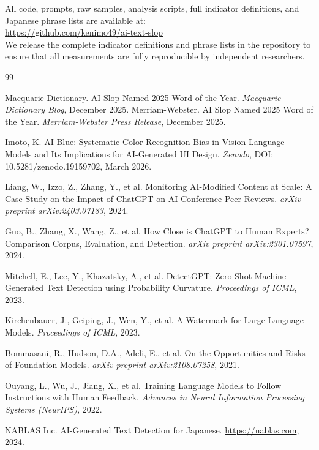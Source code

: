 \documentclass[11pt,a4paper]{article}
\begin{document}
All code, prompts, raw samples, analysis scripts, full indicator definitions, and Japanese phrase lists are available at:\\
\url{https://github.com/kenimo49/ai-text-slop}\\
We release the complete indicator definitions and phrase lists in the repository to ensure that all measurements are fully reproducible by independent researchers.

\begin{thebibliography}{99}

Macquarie Dictionary.
AI Slop Named 2025 Word of the Year.
\textit{Macquarie Dictionary Blog}, December 2025.
Merriam-Webster.
AI Slop Named 2025 Word of the Year.
\textit{Merriam-Webster Press Release}, December 2025.

Imoto, K.
AI Blue: Systematic Color Recognition Bias in Vision-Language Models and Its Implications for AI-Generated UI Design.
\textit{Zenodo}, DOI: 10.5281/zenodo.19159702, March 2026.

Liang, W., Izzo, Z., Zhang, Y., et al.
Monitoring AI-Modified Content at Scale: A Case Study on the Impact of ChatGPT on AI Conference Peer Reviews.
\textit{arXiv preprint arXiv:2403.07183}, 2024.

Guo, B., Zhang, X., Wang, Z., et al.
How Close is ChatGPT to Human Experts? Comparison Corpus, Evaluation, and Detection.
\textit{arXiv preprint arXiv:2301.07597}, 2024.

Mitchell, E., Lee, Y., Khazatsky, A., et al.
DetectGPT: Zero-Shot Machine-Generated Text Detection using Probability Curvature.
\textit{Proceedings of ICML}, 2023.

Kirchenbauer, J., Geiping, J., Wen, Y., et al.
A Watermark for Large Language Models.
\textit{Proceedings of ICML}, 2023.

Bommasani, R., Hudson, D.A., Adeli, E., et al.
On the Opportunities and Risks of Foundation Models.
\textit{arXiv preprint arXiv:2108.07258}, 2021.

Ouyang, L., Wu, J., Jiang, X., et al.
Training Language Models to Follow Instructions with Human Feedback.
\textit{Advances in Neural Information Processing Systems (NeurIPS)}, 2022.

NABLAS Inc.
AI-Generated Text Detection for Japanese.
\url{https://nablas.com}, 2024.

\end{thebibliography}
\end{document}
